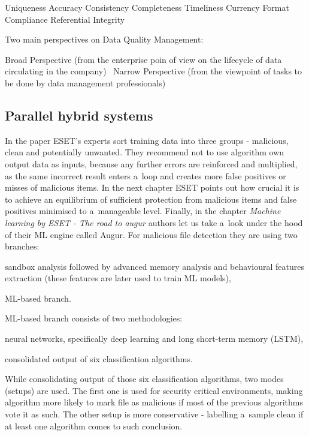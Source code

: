 Uniqueness
Accuracy
Consistency
Completeness
Timeliness
Currency
Format Compliance
Referential Integrity

Two main perspectives on Data Quality Management:

Broad Perspective (from the enterprise poin of view on the lifecycle of data circulating in the company)~\cite{book:dama}
Narrow Perspective (from the viewpoint of tasks to be done by data management professionals)~\cite{pres:dcam}



\subsection{Parallel hybrid systems}\label{subsec:parallel-hybrid-systems}

In the paper  ESET's experts sort training data into three groups - malicious, clean and potentially unwanted.
They recommend not to use algorithm own output data as inputs, because any further errors are reinforced and multiplied, as the same incorrect result enters a~loop and creates more false positives or misses of malicious items.
In the next chapter ESET points out how crucial it is to achieve an equilibrium of sufficient protection from malicious items and false positives minimised to a~manageable level.
Finally, in the chapter \textit{Machine learning by ESET - The road to augur} authors let us take a~look under the hood of their ML engine called Augur.
For malicious file detection they are using two branches:
\begin{enumerate*}[label=(\roman*)]
    \item sandbox analysis followed by advanced memory analysis and behavioural features extraction (these features are later used to train ML models),
    \item ML-based branch.
\end{enumerate*}
ML-based branch consists of two methodologies:
\begin{enumerate*}[label=(\roman*)]
    \item neural networks, specifically deep learning and long short-term memory (LSTM),

    \item consolidated output of six classification algorithms.
\end{enumerate*}
While consolidating output of those six classification algorithms, two modes (setups) are used.
The first one is used for security critical environments, making algorithm more likely to mark file as malicious if most of the previous algorithms vote it as such.
The other setup is more conservative - labelling a~sample clean if at least one algorithm comes to such conclusion.

